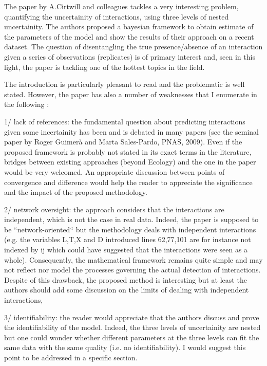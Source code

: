 \documentclass[12pt]{letter}
\newenvironment{refquote}{\bigskip \begin{it}}{\end{it}\smallskip}
\begin{document}
	\begin{refquote}
	The paper by A.Cirtwill and colleagues tackles a very interesting problem, quantifying the uncertainity of interactions, using three levels of nested uncertainity. The authors proposed a bayesian framework to obtain estimate of the parameters of the model and show the results of their approach on a recent dataset. The question of disentangling the true presence/absence of an interaction given a series of observations (replicates) is of primary interest and, seen in this light, the paper is tackling one of the hottest topics in the field.

	The introduction is particularly pleasant to read and the problematic is well stated. However, the paper has also a number of weaknesses that I enumerate in the following :

	1/ lack of references: the fundamental question about predicting interactions given some incertainity has been and is debated in many papers (see the seminal paper by Roger Guimerà and Marta Sales-Pardo, PNAS, 2009). Even if the proposed framework is probably not stated in its exact terms in the literature, bridges between existing approaches (beyond Ecology) and the one in the paper would be very welcomed. An appropriate discussion between points of convergence and difference would help the reader to appreciate the significance and the impact of the proposed methodology.

	2/ network oversight: the approach considers that the interactions are independent, which is not the case in real data. Indeed, the paper is supposed to be “network-oriented“ but the methodology deals with independent interactions (e.g. the variables L,T,X and D introduced lines 62,77,101 are for instance not indexed by ij which could have suggested that the interactions were seen as a whole). Consequently, the mathematical framework remains quite simple and may not reflect nor model the processes governing the actual detection of interactions. Despite of this drawback, the proposed method is interesting but at least the authors should add some discussion on the limits of dealing with independent interactions,

	3/ identifiability: the reader would appreciate that the authors discuss and prove the identifiability of the model. Indeed, the three levels of uncertainity are nested but one could wonder whether different parameters at the three levels can fit the same data with the same quality (i.e. no identifiability).  I would suggest this point to be addressed in a specific section.


\end{refquote}
\end{document}

